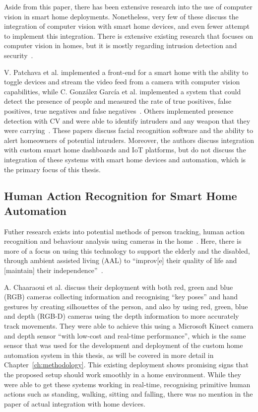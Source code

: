 Aside from this paper, there has been extensive research into the use of computer vision in smart home deployments.
Nonetheless, very few of these discuss the integration of computer vision with smart home devices, and even fewer attempt to implement this integration.
There is extensive existing research that focuses on computer vision in homes, but it is mostly regarding intrusion detection and security~\cite{Cucc05,Garc17,Nand20,Patc15,Sefa14,Zhan19}.

V. Patchava et al. implemented a front-end for a smart home with the ability to toggle devices and stream the video feed from a camera with computer vision capabilities, while C. González García et al. implemented a system that could detect the presence of people and measured the rate of true positives, false positives, true negatives and false negatives~\cite{Patc15,Garc17}.
Others implemented presence detection with CV and were able to identify intruders and any weapon that they were carrying~\cite{Cucc05,Nand20}.
These papers discuss facial recognition software and the ability to alert homeowners of potential intruders.
Moreover, the authors discuss integration with custom smart home dashboards and IoT platforms, but do not discuss the integration of these systems with smart home devices and automation, which is the primary focus of this thesis.

\subsection{Human Action Recognition for Smart Home Automation}
Futher research exists into potential methods of person tracking, human action recognition and behaviour analysis using cameras in the home~\cite{Chaa13}.
Here, there is more of a focus on using this technology to support the elderly and the disabled, through ambient assisted living (AAL) to ``improv[e] their quality of life and [maintain] their independence''~\cite{Chaa13}.

A. Chaaraoui et al. discuss their deployment with both red, green and blue (RGB) cameras collecting information and recognising ``key poses'' and hand gestures by creating silhouettes of the person, and also by using red, green, blue and depth (RGB-D) cameras using the depth information to more accurately track movements.
They were able to achieve this using a Microsoft Kinect camera and depth sensor ``with low-cost and real-time performance'', which is the same sensor that was used for the development and deployment of the custom home automation system in this thesis, as will be covered in more detail in Chapter~\ref{ch:methodology}.
This existing deployment shows promising signs that the proposed setup should work smoothly in a home environment.
While they were able to get these systems working in real-time, recognising primitive human actions such as standing, walking, sitting and falling, there was no mention in the paper of actual integration with home devices.

